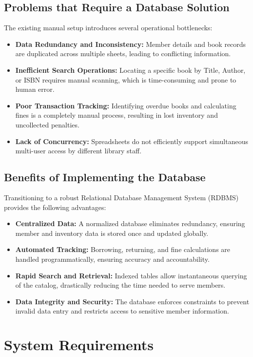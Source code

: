 \documentclass{thesis-library}
\begin{document}
\subsection{Problems that Require a Database Solution}
The existing manual setup introduces several operational bottlenecks:
\begin{itemize}
    \item \textbf{Data Redundancy and Inconsistency:} Member details and book records are duplicated across multiple sheets, leading to conflicting information.
    \item \textbf{Inefficient Search Operations:} Locating a specific book by Title, Author, or ISBN requires manual scanning, which is time-consuming and prone to human error.
    \item \textbf{Poor Transaction Tracking:} Identifying overdue books and calculating fines is a completely manual process, resulting in lost inventory and uncollected penalties.
    \item \textbf{Lack of Concurrency:} Spreadsheets do not efficiently support simultaneous multi-user access by different library staff.
\end{itemize}

\subsection{Benefits of Implementing the Database}
Transitioning to a robust Relational Database Management System (RDBMS) provides the following advantages:
\begin{itemize}
    \item \textbf{Centralized Data:} A normalized database eliminates redundancy, ensuring member and inventory data is stored once and updated globally.
    \item \textbf{Automated Tracking:} Borrowing, returning, and fine calculations are handled programmatically, ensuring accuracy and accountability.
    \item \textbf{Rapid Search and Retrieval:} Indexed tables allow instantaneous querying of the catalog, drastically reducing the time needed to serve members.
    \item \textbf{Data Integrity and Security:} The database enforces constraints to prevent invalid data entry and restricts access to sensitive member information.
\end{itemize}

\section{System Requirements}
\end{document}
